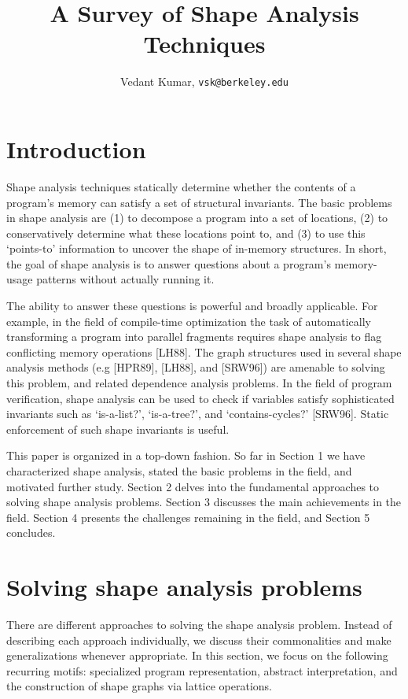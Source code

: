 \documentclass{article}
\title{A Survey of Shape Analysis Techniques}
\author{Vedant Kumar, \texttt{vsk@berkeley.edu}}
\begin{document}
\maketitle

\section{Introduction}

Shape analysis techniques statically determine whether the contents of a
program's memory can satisfy a set of structural invariants. The basic
problems in shape analysis are (1) to decompose a program into a set of
locations, (2) to conservatively determine what these locations point to,
and (3) to use this `points-to' information to uncover the shape of
in-memory structures. In short, the goal of shape analysis is to answer
questions about a program's memory-usage patterns without actually running
it.

The ability to answer these questions is powerful and broadly applicable.
For example, in the field of compile-time optimization the task of
automatically transforming a program into parallel fragments requires shape
analysis to flag conflicting memory operations [LH88]. The graph structures
used in several shape analysis methods (e.g [HPR89], [LH88], and [SRW96])
are amenable to solving this problem, and related dependence analysis
problems. In the field of program verification, shape analysis can be used
to check if variables satisfy sophisticated invariants such as `is-a-list?',
`is-a-tree?', and `contains-cycles?' [SRW96]. Static enforcement of such
shape invariants is useful.

This paper is organized in a top-down fashion. So far in Section 1 we have
characterized shape analysis, stated the basic problems in the field, and
motivated further study. Section 2 delves into the fundamental approaches to
solving shape analysis problems. Section 3 discusses the main achievements
in the field. Section 4 presents the challenges remaining in the field, and
Section 5 concludes.

\section{Solving shape analysis problems}

There are different approaches to solving the shape analysis problem.
Instead of describing each approach individually, we discuss their
commonalities and make generalizations whenever appropriate. In this
section, we focus on the following recurring motifs: specialized program
representation, abstract interpretation, and the construction of shape
graphs via lattice operations.
\end{document}
